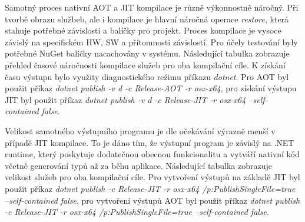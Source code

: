 
Samotný proces nativní AOT a JIT kompilace je různě výkonnostně náročný. Při tvorbě obrazu službeb, ale i kompilace je hlavní náročná operace \emph{restore}, která stahuje potřebné závislosti a balíčky pro projekt. Proces kompilace je vysoce závislý na specifickém HW, SW a přítomnosti závislostí. Pro účely testování byly potřebné NuGet balíčky nacachovány v systému. Následující tabulka zobrazuje přehled časové náročnosti kompilace služeb pro oba kompilační cíle. K získání času výstupu bylo využity diagnostického režimu příkazu \emph{dotnet}. Pro AOT byl použit příkaz \emph{dotnet publish -v d -c Release-AOT -r osx-x64}, pro získání výstupu JIT byl použit příkaz \emph{dotnet publish -v d -c Release-JIT -r osx-x64 --self-contained false}.



Velikost samotného výstupního programu je dle očekávání výrazně menší v případě JIT kompilace. To je dáno tím, že výstupní program je závislý na .NET runtime, který poskytuje dodatečnou obecnou funkcionalitu a vytváří nativní kód včetně generování typů až za běhu aplikace. Následující tabulka zobrazuje velikost služeb pro oba kompilační cíle. Pro vytvoření výstupů na základě JIT byl použit příkaz \emph{dotnet publish -c Release-JIT -r osx-x64 /p:PublishSingleFile=true --self-contained false}, pro vytvoření výstupů AOT byl použit příkaz \emph{dotnet publish -c Release-JIT -r osx-x64 /p:PublishSingleFile=true --self-contained false}.


